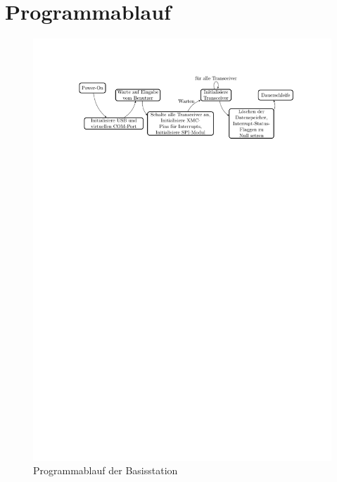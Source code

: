 \section{Programmablauf}
\begin{figure}[th]
\centering
\includegraphics[width=0.7\linewidth, trim=3.2cm 22.7cm 2.5cm 2.5cm,clip=true]{Abbildungen/Blockdiagramme/Initialisierung}
\caption{Programmablauf der Basisstation}
\label{fig:initialisierung}
\end{figure}

